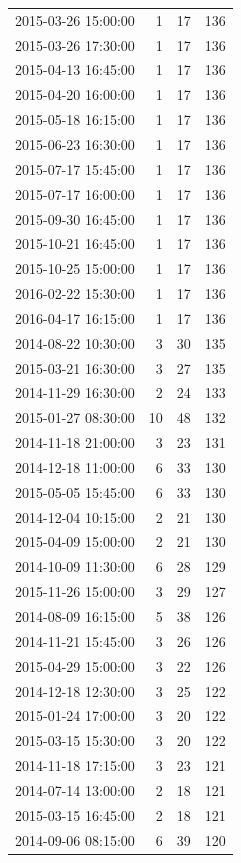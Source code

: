 \begin{tabular}{lrrr}
2015-03-26 15:00:00 & 1 & 17 & 136 \\
2015-03-26 17:30:00 & 1 & 17 & 136 \\
2015-04-13 16:45:00 & 1 & 17 & 136 \\
2015-04-20 16:00:00 & 1 & 17 & 136 \\
2015-05-18 16:15:00 & 1 & 17 & 136 \\
2015-06-23 16:30:00 & 1 & 17 & 136 \\
2015-07-17 15:45:00 & 1 & 17 & 136 \\
2015-07-17 16:00:00 & 1 & 17 & 136 \\
2015-09-30 16:45:00 & 1 & 17 & 136 \\
2015-10-21 16:45:00 & 1 & 17 & 136 \\
2015-10-25 15:00:00 & 1 & 17 & 136 \\
2016-02-22 15:30:00 & 1 & 17 & 136 \\
2016-04-17 16:15:00 & 1 & 17 & 136 \\
2014-08-22 10:30:00 & 3 & 30 & 135 \\
2015-03-21 16:30:00 & 3 & 27 & 135 \\
2014-11-29 16:30:00 & 2 & 24 & 133 \\
2015-01-27 08:30:00 & 10 & 48 & 132 \\
2014-11-18 21:00:00 & 3 & 23 & 131 \\
2014-12-18 11:00:00 & 6 & 33 & 130 \\
2015-05-05 15:45:00 & 6 & 33 & 130 \\
2014-12-04 10:15:00 & 2 & 21 & 130 \\
2015-04-09 15:00:00 & 2 & 21 & 130 \\
2014-10-09 11:30:00 & 6 & 28 & 129 \\
2015-11-26 15:00:00 & 3 & 29 & 127 \\
2014-08-09 16:15:00 & 5 & 38 & 126 \\
2014-11-21 15:45:00 & 3 & 26 & 126 \\
2015-04-29 15:00:00 & 3 & 22 & 126 \\
2014-12-18 12:30:00 & 3 & 25 & 122 \\
2015-01-24 17:00:00 & 3 & 20 & 122 \\
2015-03-15 15:30:00 & 3 & 20 & 122 \\
2014-11-18 17:15:00 & 3 & 23 & 121 \\
2014-07-14 13:00:00 & 2 & 18 & 121 \\
2015-03-15 16:45:00 & 2 & 18 & 121 \\
2014-09-06 08:15:00 & 6 & 39 & 120 \\

\end{tabular}
